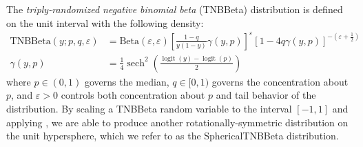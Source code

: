 The \textit{triply-randomized negative binomial beta} (TNBBeta) distribution \citep{lederman2026triplyrandomizednegativebinomialbeta}
is defined on the unit interval with the following density:
\begin{align*}
    \text{TNBBeta}(y; p, q, \varepsilon) &= \text{Beta}(\varepsilon, \varepsilon)\left[\frac{1 - q}{y(1 - y)}\gamma(y, p)\right]^{\varepsilon}\left[1 - 4q\gamma(y, p)\right]^{-\left(\varepsilon + \frac{1}{2}\right)} \\
    \gamma(y, p) &= \frac{1}{4}\operatorname{sech}^2\left(\frac{\operatorname{logit}(y) - \operatorname{logit}(p)}{2}\right)
\end{align*}
where $p \in (0, 1)$ governs the median, $q \in [0, 1)$ governs the concentration about $p$, and $\varepsilon > 0$
controls both concentration about $p$ and tail behavior of the distribution. By scaling a TNBBeta random variable to
the interval $[-1, 1]$ and applying , we are able to produce another rotationally-symmetric
distribution on the unit hypersphere, which we refer to as the SphericalTNBBeta distribution.

